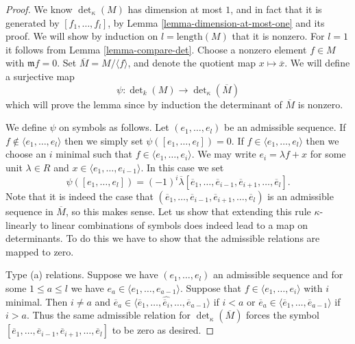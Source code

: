 \documentclass[10pt,a4paper]{amsart}
\theoremstyle{plain}
\theoremstyle{definition}
\theoremstyle{remark}
\numberwithin{equation}{subsection}
\begin{document}
\begin{proof}
We know $\det_\kappa(M)$ has dimension at most $1$, and in fact that it
is generated by $[f_1, \ldots, f_l]$, by
Lemma \ref{lemma-dimension-at-most-one} and its proof.
We will show by induction on $l = \text{length}(M)$
that it is nonzero. For $l = 1$ it follows from Lemma \ref{lemma-compare-det}.
Choose a nonzero element $f \in M$
with $\mathfrak m f = 0$. Set $\overline{M} = M /\langle f \rangle$,
and denote the quotient map $x \mapsto \overline{x}$.
We will define a surjective map
$$
\psi : \det\nolimits_k(M) \to \det\nolimits_\kappa(\overline{M})
$$
which will prove the lemma since by induction the determinant of
$\overline{M}$ is nonzero.

\medskip\noindent
We define $\psi$ on symbols as follows.
Let $(e_1, \ldots, e_l)$ be an admissible sequence.
If $f \not \in \langle e_1, \ldots, e_l \rangle$ then
we simply set $\psi([e_1, \ldots, e_l]) = 0$.
If $f \in \langle e_1, \ldots, e_l \rangle$ then we choose
an $i$ minimal such that $f \in \langle e_1, \ldots, e_i \rangle$.
We may write $e_i = \lambda f + x$ for some unit $\lambda \in R$
and $x \in \langle e_1, \ldots, e_{i - 1} \rangle$.
In this case we set
$$
\psi([e_1, \ldots, e_l]) =
(-1)^i
\overline{\lambda}[\overline{e}_1, \ldots,
\overline{e}_{i - 1},
\overline{e}_{i + 1}, \ldots, \overline{e}_l].
$$
Note that it is indeed the case that
$(\overline{e}_1, \ldots,
\overline{e}_{i - 1},
\overline{e}_{i + 1}, \ldots, \overline{e}_l)$
is an admissible sequence in $\overline{M}$, so this makes sense.
Let us show that extending this rule $\kappa$-linearly to
linear combinations of symbols does indeed lead to a map on
determinants. To do this we have to show that the admissible
relations are mapped to zero.

\medskip\noindent
Type (a) relations. Suppose we have $(e_1, \ldots, e_l)$ an
admissible sequence and for some $1 \leq a \leq l$ we have
$e_a \in \langle e_1, \ldots, e_{a - 1}\rangle$.
Suppose that $f \in \langle e_1, \ldots, e_i\rangle$ with $i$ minimal.
Then $i \not = a$ and
$\overline{e}_a \in \langle \overline{e}_1, \ldots,
\hat{\overline{e}_i}, \ldots, \overline{e}_{a - 1}\rangle$ if $i < a$
or
$\overline{e}_a \in \langle \overline{e}_1, \ldots,
\overline{e}_{a - 1}\rangle$ if $i > a$.
Thus the same admissible relation for $\det_\kappa(\overline{M})$ forces
the symbol $[\overline{e}_1, \ldots,
\overline{e}_{i - 1},
\overline{e}_{i + 1}, \ldots, \overline{e}_l]$
to be zero as desired.


\end{proof}
\end{document}
